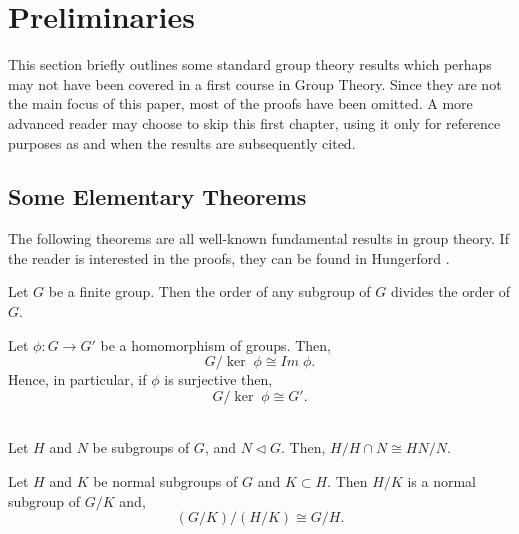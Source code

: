 \chapter{Preliminaries}\label{Ch3_Preliminaries}

This section briefly outlines some standard group theory results which perhaps may not have been covered in a first course in Group Theory. Since they are not the main focus of this paper, most of the proofs have been omitted. A more
advanced reader may choose to skip this first chapter, using it only for reference purposes as and when the results are subsequently cited. 

\section{Some Elementary Theorems}

The following theorems are all well-known fundamental results in group theory. If the reader is interested in the proofs, they can be found in Hungerford \cite{hungerford}.

\begin{theorem}
    \label{lagrange} Let $G$ be a finite group. Then the order of any subgroup of $G$ divides the order of $G$. \\
\end{theorem} 

\begin{theorem}
    \label{1stiso} Let $\phi  :G \rightarrow G'$ be a homomorphism of groups. Then, $$G/\ker \; \phi \cong Im \; \phi.$$ Hence, in particular, if $\phi$ is surjective then, $$G/\ker \; \phi \cong G'.$$ \\
\end{theorem} 

\vspace{-10mm}

\begin{theorem}
    \label{2ndiso} Let $H$ and $N$ be subgroups of $G$, and $N \vartriangleleft G$. Then, $H/H \cap N \cong HN/N.$ \\
\end{theorem} 

\vspace{-10mm}

\begin{theorem}
    \label{3rdiso} Let $H$ and $K$ be normal subgroups of $G$ and $K \subset H$. Then $H/K$ is a normal subgroup of $G/K$ and, $$(G/K)/(H/K) \cong G/H.$$ \\
\end{theorem} 

